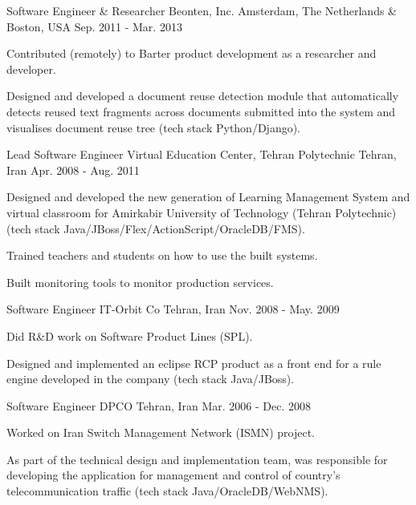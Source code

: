 \begin{cventries}
  \cventry
    {Software Engineer \& Researcher} %
    {Beonten, Inc.} %
    {Amsterdam, The Netherlands \& Boston, USA} %
    {Sep. 2011 - Mar. 2013} %
    {
      \begin{cvitems} %
        \item {Contributed (remotely) to Barter product development as a researcher and developer.}
        \item {Designed and developed a document reuse detection module that automatically detects reused text fragments across documents submitted into the system and visualises document reuse tree (tech stack Python/Django).}
      \end{cvitems}
    }

  \cventry
    {Lead Software Engineer} %
    {Virtual Education Center, Tehran Polytechnic} %
    {Tehran, Iran} %
    {Apr. 2008 - Aug. 2011} %
    {
      \begin{cvitems} %
        \item {Designed and developed the new generation of Learning Management System and virtual classroom for Amirkabir University of Technology (Tehran Polytechnic) (tech stack Java/JBoss/Flex/ActionScript/OracleDB/FMS).}
        \item {Trained teachers and students on how to use the built systems.}
        \item {Built monitoring tools to monitor production services.}
      \end{cvitems}
    }

  \cventry
    {Software Engineer} %
    {IT-Orbit Co} %
    {Tehran, Iran} %
    {Nov. 2008 - May. 2009} %
    {
      \begin{cvitems} %
        \item {Did R\&D work on Software Product Lines (SPL).}
        \item {Designed and implemented an eclipse RCP product as a front end for a rule engine developed in the company (tech stack Java/JBoss).}
      \end{cvitems}
    }

  \cventry
    {Software Engineer} %
    {DPCO} %
    {Tehran, Iran} %
    {Mar. 2006 - Dec. 2008} %
    {
      \begin{cvitems} %
        \item {Worked on Iran Switch Management Network (ISMN) project.}
        \item {As part of the technical design and implementation team, was responsible for developing the application for management and control of country's telecommunication traffic (tech stack Java/OracleDB/WebNMS).}
      \end{cvitems}
    }

\end{cventries}
